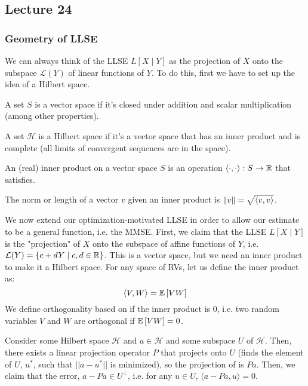 \subsection{Lecture 24}
\subsubsection{Geometry of LLSE}

We can always think of the LLSE $L[X \mid Y]$ as the projection of $X$ onto the subspace $\mathcal{L}(Y)$ of linear functions of $Y$.
To do this, first we have to set up the idea of a Hilbert space.

\begin{definition}
    A set $S$ is a vector space if it's closed under addition and scalar multiplication (among other properties).
\end{definition}

\begin{definition}
    A set $\mathcal{H}$ is a Hilbert space if it's a vector space that has an inner product and is complete (all limits of convergent sequences are in the space).
\end{definition}

\begin{definition}
    An (real) inner product on a vector space $S$ is an operation $\langle \cdot, \cdot \rangle : S \to \operatorname{\mathbb{R}}$
    that satisfies.
\end{definition}

\begin{definition}[Norm]
    The norm or length of a vector $v$ given an inner product is $\norm{v} = \sqrt{\langle v, v \rangle}$.
\end{definition}

We now extend our optimization-motivated LLSE in order to allow our estimate to be a general function, i.e. the MMSE. First, we claim that
the LLSE $L[X \mid Y]$ is the "projection" of $X$ onto the subspace of affine functions of $Y$, i.e. $\mathcal{L}(Y) = \{ c + dY \mid c, d \in \operatorname{\mathbb{R}} \}$. This is a vector space,
but we need an inner product to make it a Hilbert space. For any space of RVs, let us define the inner product as:
\[ \langle V, W \rangle = \mathbb{E}\left[ VW \right] \]
We define orthogonality based on if the inner product is 0, i.e. two random variables $V$ and $W$ are orthogonal if $\mathbb{E}\left[ VW \right] = 0$.

\begin{theorem}
    Consider some Hilbert space $\mathcal{H}$ and $a \in \mathcal{H}$ and some subspace $U$ of $\mathcal{H}$. Then, there exists a linear projection operator $P$ that projects onto $U$
    (finds the element of $U$, $u^*$, such that $||a - u^*||$ is minimized),
    so the projection of is $Pa$. Then, we claim that the error, $a - Pa \in U^{\perp}$, i.e. for any $u \in U$, $\langle a - Pa, u \rangle = 0$.
\end{theorem}

